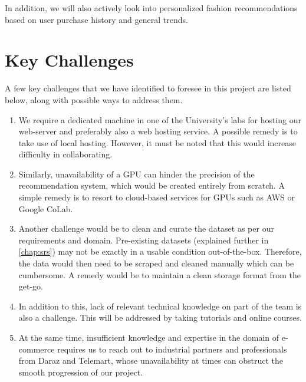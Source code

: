 In addition, we will also actively look into personalized fashion recommendations based on user purchase history and general trends.

\section{Key Challenges}

A few key challenges that we have identified to foresee in this project are listed below, along with possible ways to address them.

\begin{enumerate}
	\item We require a dedicated machine in one of the University’s labs for hosting our web-server and preferably also a web hosting service. A possible remedy is to take use of local hosting. However, it must be noted that this would increase difficulty in collaborating.
	\item Similarly, unavailability of a GPU can hinder the precision of the recommendation system, which would be created entirely from scratch. A simple remedy is to resort to cloud-based services for GPUs such as AWS or Google CoLab.
	\item Another challenge would be to clean and curate the dataset as per our requirements and domain. Pre-existing datasets (explained further in \autoref{chap:srs}) may not be exactly in a usable condition out-of-the-box. Therefore, the data would then need to be scraped and cleaned manually which can be cumbersome. A remedy would be to maintain a clean storage format from the get-go.
	\item In addition to this, lack of relevant technical knowledge on part of the team is also a challenge. This will be addressed by taking tutorials and online courses.
	\item At the same time, insufficient knowledge and expertise in the domain of e-commerce requires us to reach out to industrial partners and professionals from Daraz and Telemart, whose unavailability at times can obstruct the smooth progression of our project.
\end{enumerate}